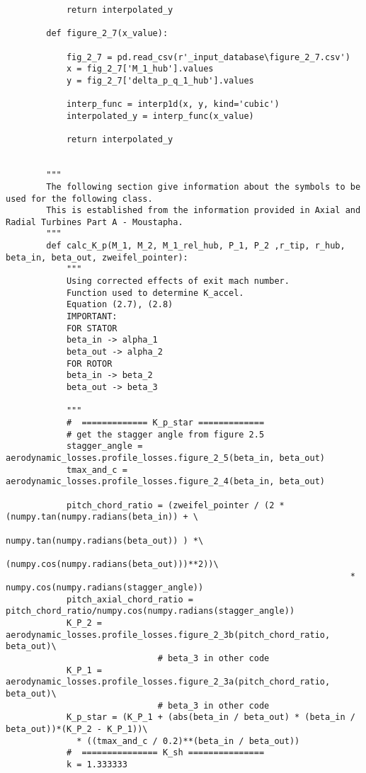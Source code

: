 \begin{verbatim}
            return interpolated_y

        def figure_2_7(x_value):

            fig_2_7 = pd.read_csv(r'_input_database\figure_2_7.csv')
            x = fig_2_7['M_1_hub'].values
            y = fig_2_7['delta_p_q_1_hub'].values

            interp_func = interp1d(x, y, kind='cubic')
            interpolated_y = interp_func(x_value)
            
            return interpolated_y


        """
        The following section give information about the symbols to be used for the following class.
        This is established from the information provided in Axial and Radial Turbines Part A - Moustapha.
        """
        def calc_K_p(M_1, M_2, M_1_rel_hub, P_1, P_2 ,r_tip, r_hub, beta_in, beta_out, zweifel_pointer):
            """
            Using corrected effects of exit mach number.
            Function used to determine K_accel.
            Equation (2.7), (2.8)
            IMPORTANT:
            FOR STATOR
            beta_in -> alpha_1
            beta_out -> alpha_2
            FOR ROTOR
            beta_in -> beta_2
            beta_out -> beta_3

            """
            #  ============= K_p_star =============
            # get the stagger angle from figure 2.5
            stagger_angle = aerodynamic_losses.profile_losses.figure_2_5(beta_in, beta_out)
            tmax_and_c = aerodynamic_losses.profile_losses.figure_2_4(beta_in, beta_out)

            pitch_chord_ratio = (zweifel_pointer / (2 * (numpy.tan(numpy.radians(beta_in)) + \
                                                         numpy.tan(numpy.radians(beta_out)) ) *\
                                                              (numpy.cos(numpy.radians(beta_out)))**2))\
                                                                    * numpy.cos(numpy.radians(stagger_angle))
            pitch_axial_chord_ratio = pitch_chord_ratio/numpy.cos(numpy.radians(stagger_angle))
            K_P_2 = aerodynamic_losses.profile_losses.figure_2_3b(pitch_chord_ratio, beta_out)\
                              # beta_3 in other code
            K_P_1 = aerodynamic_losses.profile_losses.figure_2_3a(pitch_chord_ratio, beta_out)\
                              # beta_3 in other code
            K_p_star = (K_P_1 + (abs(beta_in / beta_out) * (beta_in / beta_out))*(K_P_2 - K_P_1))\
              * ((tmax_and_c / 0.2)**(beta_in / beta_out))
            #  =============== K_sh ===============
            k = 1.333333


\end{verbatim}
